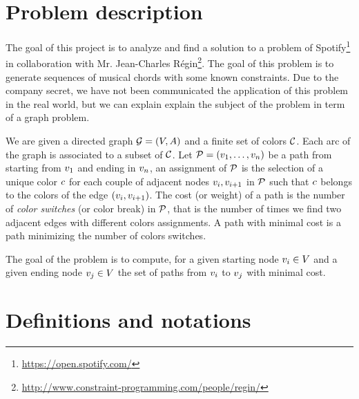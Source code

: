 \section{Problem description}

The goal of this project is to analyze and find a solution to a problem of Spotify\footnote{\url{https://open.spotify.com/}} in collaboration with Mr. Jean-Charles Régin\footnote{\url{http://www.constraint-programming.com/people/regin/}}. The goal of this problem is to generate sequences of musical chords with some known constraints. Due to the company secret, we have not been communicated the application of this problem in the real world, but we can explain explain the subject of the problem in term of a graph problem.

We are given a directed graph $\mathcal{G} = (V, A)$ and a finite set of colors $\mathcal{C}$. Each arc of the graph is associated to a subset of $\mathcal{C}$. Let $\mathcal{P} = (v_1,\ldots,v_{n})$ be a path from starting from $v_1$ and ending in $v_n$, an assignment of $\mathcal{P}$ is the selection of a unique color $c$ for each couple of adjacent nodes $v_i, v_{i+1}$ in $\mathcal{P}$ such that $c$ belongs to the colors of the edge $(v_i, v_{i+1})$. The cost (or weight) of a path is the number of \textit{color switches} (or color break) in $\mathcal{P}$, that is the number of times we find two adjacent edges with different colors assignments. A path with minimal cost is a path minimizing the number of colors switches.

The goal of the problem is to compute, for a given starting node $v_i \in V$ and a given ending node $v_j \in V$ the set of paths from $v_i$ to $v_j$ with minimal cost.

\section{Definitions and notations}

